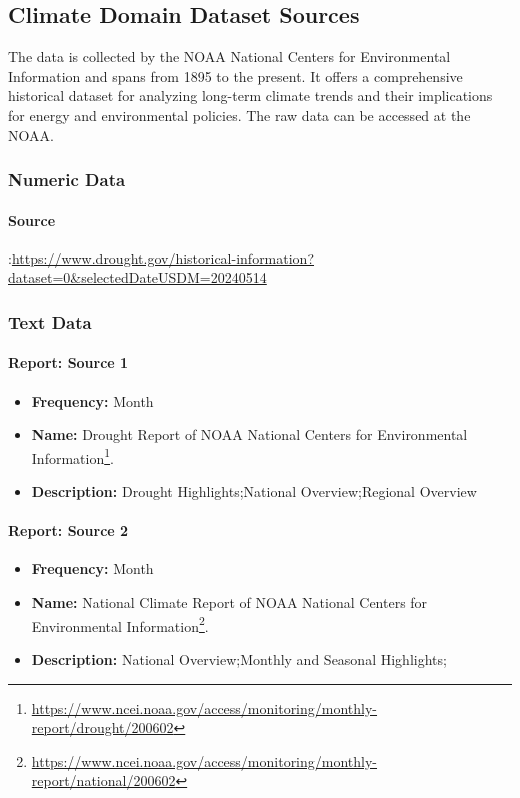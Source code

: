  \subsection{Climate  Domain Dataset Sources}
The data is collected by the NOAA National Centers for Environmental Information and spans from 1895 to the present. It offers a comprehensive historical dataset for analyzing long-term climate trends and their implications for energy and environmental policies. The raw data can be accessed at the NOAA.

\subsubsection{Numeric Data}
\paragraph{Source}:\url{https://www.drought.gov/historical-information?dataset=0&selectedDateUSDM=20240514}

\subsubsection{Text Data}
\paragraph{Report: Source 1}
\begin{itemize}
    \item \textbf{Frequency:} Month
    \item \textbf{Name:} Drought Report of NOAA National Centers for Environmental Information\footnote{\url{https://www.ncei.noaa.gov/access/monitoring/monthly-report/drought/200602}}.
    \item \textbf{Description:} Drought Highlights;National Overview;Regional Overview

\end{itemize}
\paragraph{Report: Source 2}
\begin{itemize}
    \item \textbf{Frequency:} Month
    \item \textbf{Name:} National Climate Report of NOAA National Centers for Environmental Information\footnote{\url{https://www.ncei.noaa.gov/access/monitoring/monthly-report/national/200602}}.
    \item \textbf{Description:} National Overview;Monthly and Seasonal Highlights;
\end{itemize}
